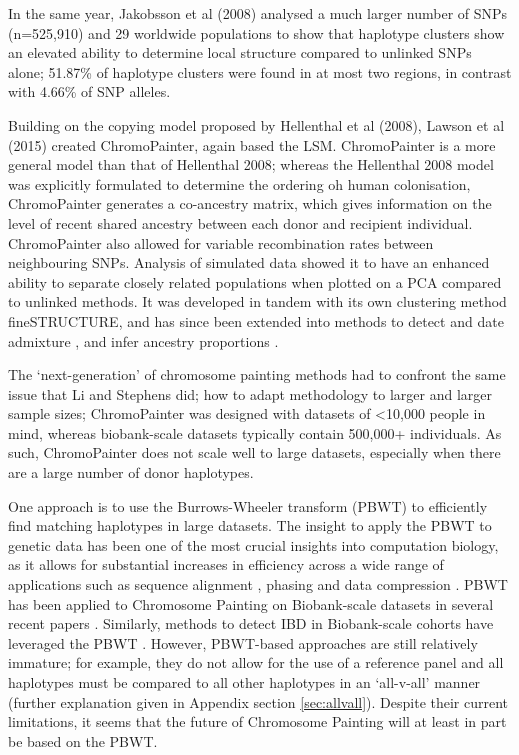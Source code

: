 In the same year, Jakobsson et al (2008) analysed a much larger number of SNPs (n=525,910) and 29 worldwide populations \cite{jakobsson2008genotype} to show that haplotype clusters show an elevated ability to determine local structure compared to unlinked SNPs alone;  51.87\% of haplotype clusters were found in at most two regions, in contrast with 4.66\% of SNP alleles. 

Building on the copying model proposed by Hellenthal et al (2008), Lawson et al (2015) \cite{Lawson2012} created ChromoPainter, again based the LSM. ChromoPainter is a more general model than that of Hellenthal 2008; whereas the Hellenthal 2008 model was explicitly formulated to determine the ordering oh human colonisation, ChromoPainter generates a co-ancestry matrix, which gives information on the level of recent shared ancestry between each donor and recipient individual. ChromoPainter also allowed for variable recombination rates between neighbouring SNPs. Analysis of simulated data showed it to have an enhanced ability to separate closely related populations when plotted on a PCA compared to unlinked methods. It was developed in tandem with its own clustering method fineSTRUCTURE, and has since been extended into methods to detect and date admixture \cite{Hellenthal2014}, and infer ancestry proportions \cite{Chacon-Duque2018}. 

The `next-generation' of chromosome painting methods had to confront the same issue that Li and Stephens did; how to adapt methodology to larger and larger sample sizes; ChromoPainter was designed with datasets of <10,000 people in mind, whereas biobank-scale datasets typically contain 500,000+ individuals. As such, ChromoPainter does not scale well to large datasets, especially when there are a large number of donor haplotypes. 

One approach is to use the Burrows-Wheeler transform (PBWT) \cite{burrows1994block, DurbinPBWT} to efficiently find matching haplotypes in large datasets. The insight to apply the PBWT to genetic data has been one of the most crucial insights into computation biology, as it allows for substantial increases in efficiency across a wide range of applications such as sequence alignment \cite{LiBWA}, phasing \cite{delaneau2018integrative} and data compression \cite{naseri2019multi}. PBWT has been applied to Chromosome Painting on Biobank-scale datasets in several recent papers \cite{byrne2020dutch, saada2020identity}. Similarly, methods to detect IBD in Biobank-scale cohorts have leveraged the PBWT \cite{naseri2019rapid, zhou2020fast}. However, PBWT-based approaches are still relatively immature; for example, they do not allow for the use of a reference panel and all haplotypes must be compared to all other haplotypes in an `all-v-all' manner (further explanation given in Appendix section \ref{sec:allvall}). Despite their current limitations, it seems that the future of Chromosome Painting will at least in part be based on the PBWT. 

